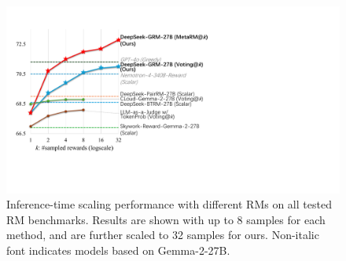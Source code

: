 \documentclass{article} %
\newcommand{\SGRMAll}{DeepSeek-GRM\xspace}
\begin{document}
\begin{abstract}
\end{abstract}


\begin{figure}
    \vspace{-4.5em}
    \centering
    \includegraphics[width=\linewidth]{figures/fig1-preprint.pdf}
    \caption{Inference-time scaling performance with different RMs on all tested RM benchmarks. Results are shown with up to 8 samples for each method, and are further scaled to 32 samples for ours. Non-italic font indicates models based on Gemma-2-27B.}
    \label{fig:perf-overview}
\end{figure}
\end{document}
